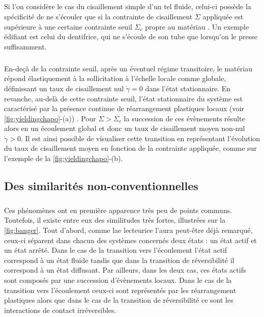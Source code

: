 \subparagraph{}Si l'on considère le cas du cisaillement simple  d'un tel fluide, celui-ci possède la spécificité de ne s'écouler que si la contrainte de cisaillement $\Sigma$ appliquée est supérieure à une certaine contrainte seuil $\Sigma_c$ propre au matériau \cite{bonn_yield_2017, nicolas_deformation_2018}. Un exemple édifiant est celui du dentifrice, qui ne s'écoule de son tube que lorsqu'on le presse suffisamment. 

\subparagraph{}En-deçà de la contrainte seuil, après un éventuel régime transitoire, le matériau répond élastiquement à la sollicitation à l'échelle locale comme globale, définissant un taux de cisaillement nul $\dot{\gamma}=0$ dans l'état stationnaire. En revanche, au-delà de cette contrainte seuil, l'état stationnaire du système est caractérisé par la présence continue de réarrangement plastiques locaux (voir \autoref{fig:yieldingchapo}-(a)) \cite{princen_rheology_1986, biance_topological_2009,picard_elastic_2004}. Pour $\Sigma > \Sigma_c$ la succession de ces évènements résulte alors en un écoulement global et donc un taux de cisaillement moyen non-nul $\dot{\gamma}>0$. Il est ainsi possible de visualiser cette transition en représentant l'évolution du taux de cisaillement moyen en fonction de la contrainte appliquée, comme sur l'exemple de la \autoref{fig:yieldingchapo}-(b).


\subsection{Des similarités non-conventionnelles}

\subparagraph{}Ces phénomènes ont en première apparence très peu de points communs. Toutefois, il existe entre eux des similitudes très fortes, illustrées sur la \autoref{fig:banger}. Tout d'abord, comme lae lecteurice l'aura peut-être déjà remarqué, ceux-ci séparent dans chacun des systèmes concernés deux états : un état actif et un état arrêté. Dans le cas de la transition vers l'écoulement l'état actif correspond à un état fluide tandis que dans la transition de réversibilité il correspond à un état diffusant. Par ailleurs, dans les deux cas, ces états actifs sont composés par une succession d'évènements locaux. Dans le cas de la transition vers l'écoulement ceux-ci sont représentés par les réarrangement plastiques alors que dans le cas de la transition de réversibilité ce sont les interactions de contact irréversibles.

